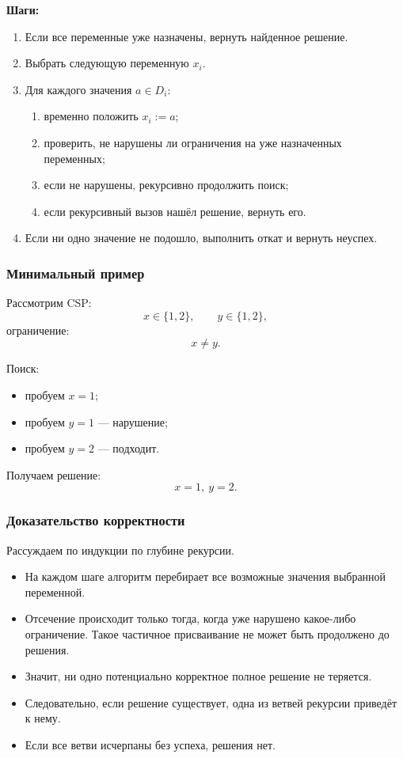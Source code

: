 \documentclass[12pt,a4paper]{article}
\theoremstyle{definition}
\theoremstyle{plain}
\begin{document}
\textbf{Шаги:}
\begin{enumerate}
\item Если все переменные уже назначены, вернуть найденное решение.
\item Выбрать следующую переменную $x_i$.
\item Для каждого значения $a\in D_i$:
\begin{enumerate}
\item временно положить $x_i:=a$;
\item проверить, не нарушены ли ограничения на уже назначенных переменных;
\item если не нарушены, рекурсивно продолжить поиск;
\item если рекурсивный вызов нашёл решение, вернуть его.
\end{enumerate}
\item Если ни одно значение не подошло, выполнить откат и вернуть неуспех.
\end{enumerate}

\subsubsection{Минимальный пример}
Рассмотрим CSP:
\[
x\in\{1,2\},\qquad y\in\{1,2\},
\]
ограничение:
\[
x\ne y.
\]

Поиск:
\begin{itemize}
\item пробуем $x=1$;
\item пробуем $y=1$ --- нарушение;
\item пробуем $y=2$ --- подходит.
\end{itemize}
Получаем решение:
\[
x=1,\ y=2.
\]

\subsubsection{Доказательство корректности}
Рассуждаем по индукции по глубине рекурсии.
\begin{itemize}
\item На каждом шаге алгоритм перебирает все возможные значения выбранной переменной.
\item Отсечение происходит только тогда, когда уже нарушено какое-либо ограничение. Такое частичное присваивание не может быть продолжено до решения.
\item Значит, ни одно потенциально корректное полное решение не теряется.
\item Следовательно, если решение существует, одна из ветвей рекурсии приведёт к нему.
\item Если все ветви исчерпаны без успеха, решения нет.
\end{itemize}
\end{document}
